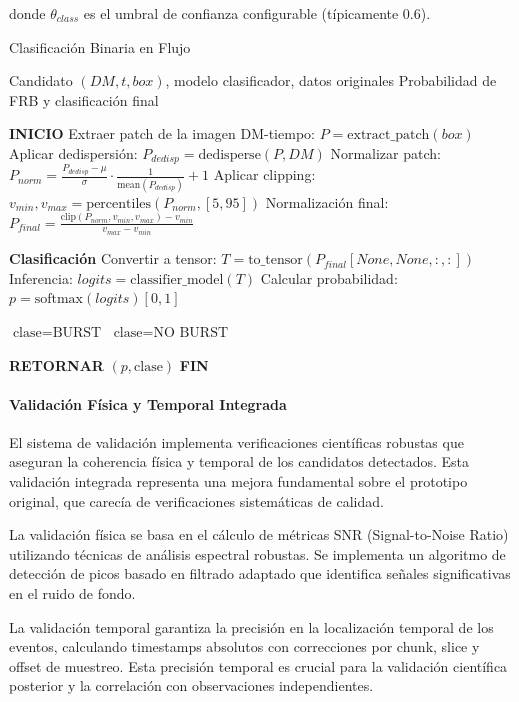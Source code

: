 donde $\theta_{class}$ es el umbral de confianza configurable (típicamente 0.6).

\begin{algorithm}[H]
\caption{Clasificación Binaria en Flujo}
\label{alg:binary-classification}
\begin{algorithmic}[1]
\Require Candidato $(DM, t, box)$, modelo clasificador, datos originales
\Ensure Probabilidad de FRB y clasificación final

\State \textbf{INICIO}
\State Extraer patch de la imagen DM-tiempo: $P = \text{extract\_patch}(box)$
\State Aplicar dedispersión: $P_{dedisp} = \text{dedisperse}(P, DM)$
\State Normalizar patch: $P_{norm} = \frac{P_{dedisp} - \mu}{\sigma} \cdot \frac{1}{\text{mean}(P_{dedisp})} + 1$
\State Aplicar clipping: $v_{min}, v_{max} = \text{percentiles}(P_{norm}, [5, 95])$
\State Normalización final: $P_{final} = \frac{\text{clip}(P_{norm}, v_{min}, v_{max}) - v_{min}}{v_{max} - v_{min}}$

\State \textbf{Clasificación}
\State Convertir a tensor: $T = \text{to\_tensor}(P_{final}[None, None, :, :])$
\State Inferencia: $logits = \text{classifier\_model}(T)$
\State Calcular probabilidad: $p = \text{softmax}(logits)[0, 1]$

    \State $\text{clase} = \text{BURST}$
\Else
    \State $\text{clase} = \text{NO BURST}$
\EndIf

\State \textbf{RETORNAR} $(p, \text{clase})$
\State \textbf{FIN}
\end{algorithmic}
\end{algorithm}
\paragraph{Validación Física y Temporal Integrada}

El sistema de validación implementa verificaciones científicas robustas que aseguran la coherencia física y temporal de los candidatos detectados. Esta validación integrada representa una mejora fundamental sobre el prototipo original, que carecía de verificaciones sistemáticas de calidad.

La validación física se basa en el cálculo de métricas SNR (Signal-to-Noise Ratio) utilizando técnicas de análisis espectral robustas. Se implementa un algoritmo de detección de picos basado en filtrado adaptado que identifica señales significativas en el ruido de fondo.

La validación temporal garantiza la precisión en la localización temporal de los eventos, calculando timestamps absolutos con correcciones por chunk, slice y offset de muestreo. Esta precisión temporal es crucial para la validación científica posterior y la correlación con observaciones independientes.

